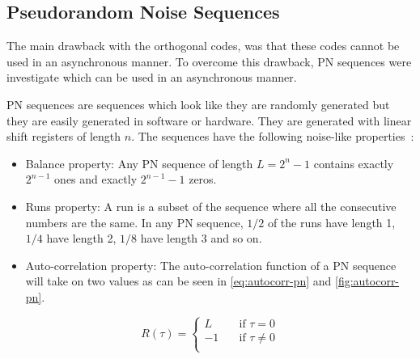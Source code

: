 
\subsection{Pseudorandom Noise Sequences}
\label{subsec:pn-sequences}

The main drawback with the orthogonal codes, was that these codes cannot be used in an asynchronous manner.
To overcome this drawback, PN sequences were investigate which can be used in an asynchronous manner.

PN sequences are sequences which look like they are randomly generated but they are easily generated in software or hardware.
They are generated with linear shift registers of length $n$.
The sequences have the following noise-like properties~\cite{mitra2008pseudo}:

\begin{itemize}
	\item Balance property:	Any PN sequence of length $L = 2^n - 1$ contains exactly $2^{n-1}$ ones and exactly $2^{n-1} - 1$ zeros.

	\item Runs property: A run is a subset of the sequence where all the consecutive numbers are the same. In any PN sequence, $1/2$ of the runs have length 1, $1/4$ have length 2, $1/8$ have length 3 and so on.

	\item Auto-correlation property: The auto-correlation function of a PN sequence will take on two values as can be seen in \autoref{eq:autocorr-pn} and \autoref{fig:autocorr-pn}.


\end{itemize}






\begin{equation}
	\label{eq:autocorr-pn}
	R(\tau) = 
		\begin{cases}
			L    & \quad \text{if } \tau = 0 \\
			-1   & \quad \text{if } \tau \neq 0 \\
		\end{cases}
\end{equation}






